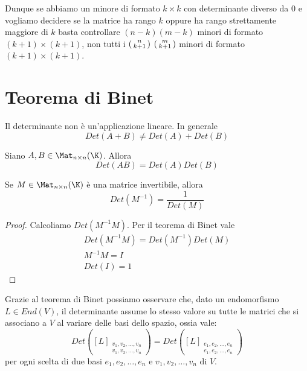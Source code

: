 Dunque se abbiamo un minore di formato $k \times k$ con determinante diverso da 0
e vogliamo decidere se la matrice ha rango $k$ oppure ha rango strettamente
maggiore di $k$ basta controllare $(n - k)(m - k)$ minori di formato
$(k + 1) \times (k + 1)$, non tutti i
$\begin{psmallmatrix} n \\ k + 1 \end{psmallmatrix}$
$\begin{psmallmatrix} m \\ k + 1 \end{psmallmatrix}$ minori di formato
$(k + 1) \times (k + 1)$.

\section{Teorema di Binet}
Il determinante non è un'applicazione lineare. In generale
\[ Det(A + B) \neq Det(A) + Det(B) \]

\begin{theorem}
	Siano $A, B \in \Mat_{n \times n}(\K)$. Allora
	\[
		Det(AB) = Det(A)Det(B)
	\]
\end{theorem}

\begin{corollary}
	Se $M \in \Mat_{n \times n}(\K)$ è una matrice invertibile, allora
	\[
		Det(M^{-1}) = \frac{1}{Det(M)}
	\]
	\begin{proof}
		Calcoliamo $Det(M^{-1} M)$. Per il teorema di Binet vale
		\begin{gather*}
			Det(M^{-1} M) = Det(M^{-1})Det(M) \\
			M^{-1}M = I \\
			Det(I) = 1
		\end{gather*}
	\end{proof}
\end{corollary}

Grazie al teorema di Binet possiamo osservare che, dato un endomorfismo
$L \in End(V)$, il determinante assume lo stesso valore su tutte le matrici
che si associano a $V$ al variare delle basi dello spazio, ossia vale:
\[
	Det \left(
	[L]_{\substack{
			v_1, v_2, \dots, v_n \\
			v_1, v_2, \dots, v_n
		}}
	\right) =
	Det \left(
	[L]_{\substack{
			e_1, e_2, \dots, e_n \\
			e_1, e_2, \dots, e_n
		}}
	\right)
\]
per ogni scelta di due basi $e_1, e_2, \dots, e_n$ e $v_1, v_2, \dots, v_n$
di $V$.

